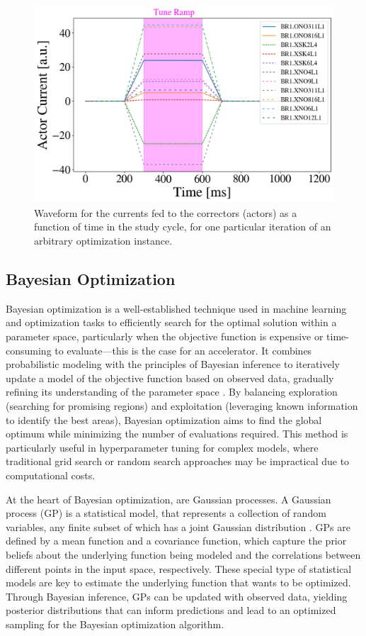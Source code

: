 \begin{figure}[H]
    \centering
    \includegraphics[width=\linewidth]{chapter5/actor_currents.png}
    \caption{Waveform for the currents fed to the correctors (actors) as a function of time in the study cycle, for one particular iteration of an arbitrary optimization instance.}
    \label{fig:actorcurrents}
\end{figure}

\subsection{Bayesian Optimization}

Bayesian optimization is a well-established technique used in machine learning and optimization tasks to efficiently search for the optimal solution within a parameter space, particularly when the objective function is expensive or time-consuming to evaluate---this is the case for an accelerator. It combines probabilistic modeling with the principles of Bayesian inference to iteratively update a model of the objective function based on observed data, gradually refining its understanding of the parameter space \cite{bayesian}. By balancing exploration (searching for promising regions) and exploitation (leveraging known information to identify the best areas), Bayesian optimization aims to find the global optimum while minimizing the number of evaluations required. This method is particularly useful in hyperparameter tuning for complex models, where traditional grid search or random search approaches may be impractical due to computational costs.

At the heart of Bayesian optimization, are Gaussian processes. A Gaussian process (GP) is a statistical model, that represents a collection of random variables, any finite subset of which has a joint Gaussian distribution \cite{bayesian}. GPs are defined by a mean function and a covariance function, which capture the prior beliefs about the underlying function being modeled and the correlations between different points in the input space, respectively. These special type of statistical models are key to estimate the underlying function that wants to be optimized. Through Bayesian inference, GPs can be updated with observed data, yielding posterior distributions that can inform predictions and lead to an optimized sampling for the Bayesian optimization algorithm. 

